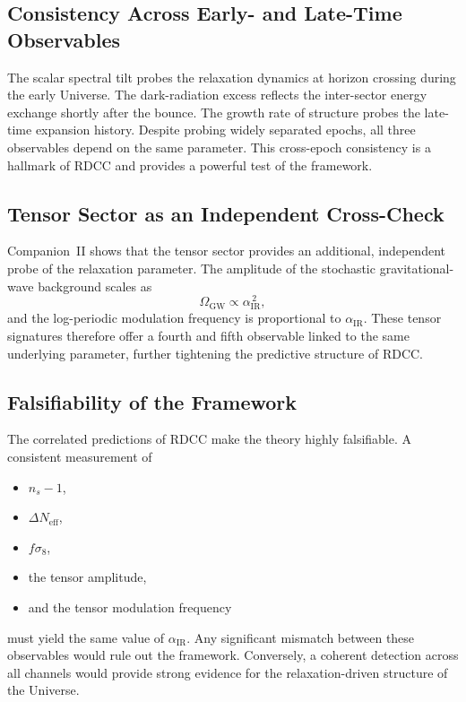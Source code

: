 \documentclass[11pt,a4paper]{article}
\begin{document}
\subsection{Consistency Across Early- and Late-Time Observables}

The scalar spectral tilt probes the relaxation dynamics at horizon crossing during the
early Universe. The dark-radiation excess reflects the inter-sector energy exchange
shortly after the bounce. The growth rate of structure probes the late-time expansion
history. Despite probing widely separated epochs, all three observables depend on the
same parameter. This cross-epoch consistency is a hallmark of RDCC and provides a
powerful test of the framework.

\subsection{Tensor Sector as an Independent Cross-Check}

Companion~II shows that the tensor sector provides an additional, independent probe of
the relaxation parameter. The amplitude of the stochastic gravitational-wave background
scales as
\begin{equation}
    \Omega_{\mathrm{GW}} \propto \alpha_{\mathrm{IR}}^{\,2},
\end{equation}
and the log-periodic modulation frequency is proportional to $\alpha_{\mathrm{IR}}$. These
tensor signatures therefore offer a fourth and fifth observable linked to the same
underlying parameter, further tightening the predictive structure of RDCC.

\subsection{Falsifiability of the Framework}

The correlated predictions of RDCC make the theory highly falsifiable. A consistent
measurement of
\begin{itemize}
    \item $n_s - 1$,
    \item $\Delta N_{\mathrm{eff}}$,
    \item $f\sigma_8$,
    \item the tensor amplitude,
    \item and the tensor modulation frequency
\end{itemize}
must yield the same value of $\alpha_{\mathrm{IR}}$. Any significant mismatch between these
observables would rule out the framework. Conversely, a coherent detection across all
channels would provide strong evidence for the relaxation-driven structure of the
Universe.
\end{document}
